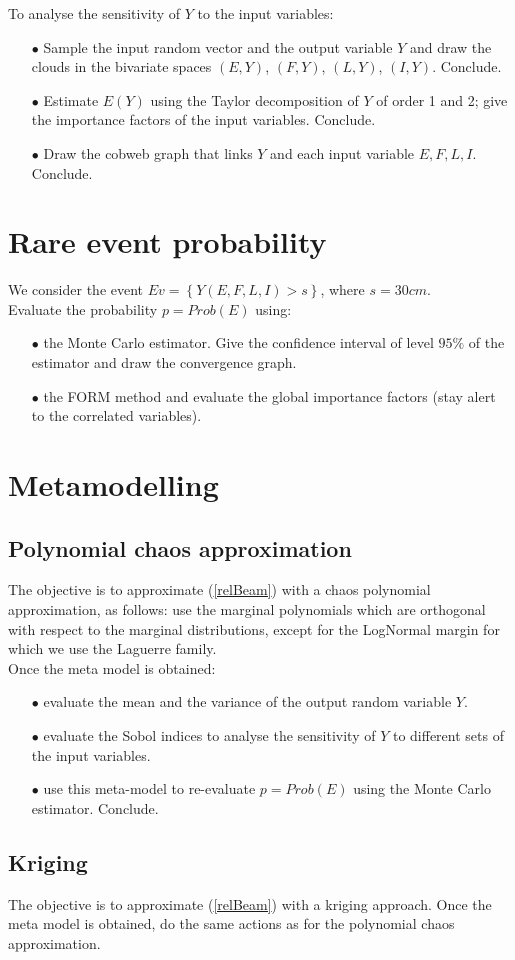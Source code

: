 \documentclass[11pt, french, A4wide]{article}
\theoremstyle{remark}
\theoremstyle{definition}
\begin{document}
To analyse the sensitivity of $Y$ to the input variables:
 \begin{itemize}
 \item[$\bullet$] Sample the input random vector and the output variable $Y$ and draw the clouds in the bivariate spaces  $(E,Y)$, $(F,Y)$, $(L,Y)$, $(I,Y)$.  Conclude.
 \item[$\bullet$] Estimate $E(Y)$ using the Taylor decomposition of $Y$ of order 1 and 2; give the importance factors of the input variables.  Conclude.
 \item[$\bullet$] Draw the cobweb graph that links $Y$ and each input variable $E, F, L, I$. Conclude.
 \end{itemize}

\newpage
\section{Rare event probability}

We consider the event $Ev = \left\{Y(E,F,L,I) > s \right\}$, where $s = 30cm$.\\

Evaluate the probability $p=Prob(E)$ using:
 \begin{itemize}
 \item[$\bullet$] the Monte Carlo estimator. Give the  confidence interval of level $95 \%$ of the estimator and draw the convergence graph.
 \item[$\bullet$] the FORM method and evaluate the global importance factors (stay alert to the correlated variables).
 \end{itemize}


\section{Metamodelling}

\subsection{Polynomial chaos approximation}

The objective is to approximate (\ref{relBeam}) with a chaos polynomial approximation, as follows: use the marginal polynomials which are orthogonal with respect to the marginal distributions, except for the LogNormal margin for which we use the Laguerre family.\\

Once the meta model is obtained:
\begin{itemize}
 \item[$\bullet$] evaluate the mean and the variance of the output random variable $Y$.
 \item[$\bullet$] evaluate the Sobol indices to analyse the sensitivity of $Y$ to different sets of the input variables.
 \item[$\bullet$] use this meta-model to re-evaluate $p=Prob(E)$ using the Monte Carlo estimator. Conclude.
 \end{itemize}



\subsection{Kriging}

The objective is to approximate (\ref{relBeam}) with a kriging approach. Once the meta model is obtained, do the same actions as for the polynomial chaos approximation.
\end{document}
